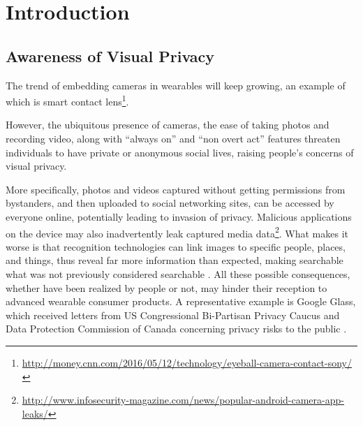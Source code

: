 \chapter{Introduction}\label{sec-introduction}

\section{Awareness of Visual Privacy}






The trend of embedding cameras in wearables will keep growing, an example of which is smart contact lens\footnote{\url{http://money.cnn.com/2016/05/12/technology/eyeball-camera-contact-sony/}}.

However, the ubiquitous presence of cameras, the ease of taking photos and recording video, along with ``always on'' and ``non overt act'' features threaten individuals to have private or anonymous social lives, raising people's concerns of visual privacy.

More specifically, photos and videos captured without getting permissions from bystanders, and then uploaded to social networking sites, can be accessed by everyone online, potentially leading to invasion of privacy.
Malicious applications on the device may also inadvertently leak captured media data\footnote{\url{http://www.infosecurity-magazine.com/news/popular-android-camera-app-leaks/}}.
What makes it worse is that recognition technologies can link images to specific people, places, and things, thus reveal far more information than expected, making searchable what was not previously considered searchable \cite{shaw2006recognition, acquisti2014face}.
All these possible consequences, whether have been realized by people or not, may hinder their reception to advanced wearable consumer products.
A representative example is Google Glass, which received letters from US Congressional Bi-Partisan Privacy Caucus and Data Protection Commission of Canada concerning privacy risks to the public \cite{congress, commission}.

